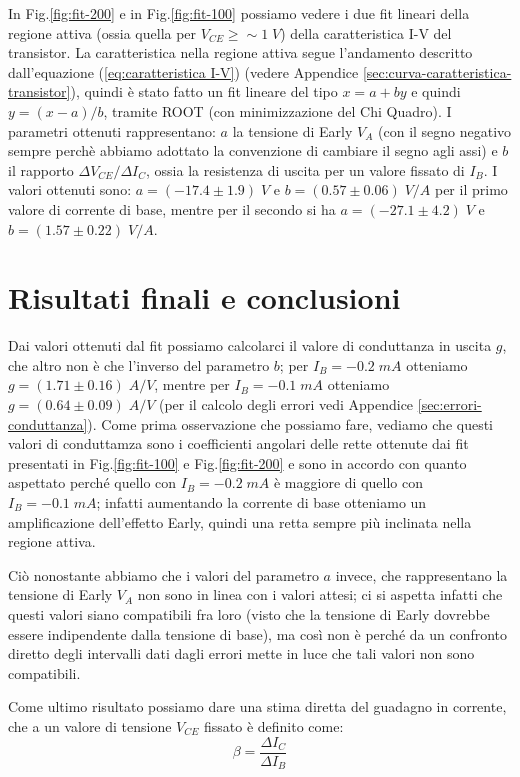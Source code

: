 \documentclass[a4paper, 11pt]{article}
\begin{document}
In Fig.\ref{fig:fit-200} e in Fig.\ref{fig:fit-100} possiamo vedere i due fit lineari della regione attiva (ossia quella per $V_{CE}\geq \sim 1 \;V $) della caratteristica I-V del transistor. La caratteristica nella regione attiva segue l'andamento descritto dall'equazione (\ref{eq:caratteristica I-V}) (vedere Appendice \ref{sec:curva-caratteristica-transistor}), quindi è stato fatto un fit lineare del tipo $x = a + by$ e quindi $y = (x-a)/b$, tramite ROOT (con minimizzazione del Chi Quadro). I parametri ottenuti rappresentano: $a$ la tensione di Early $V_A$ (con il segno negativo sempre perchè abbiamo adottato la convenzione di cambiare il segno agli assi) e $b$ il rapporto $\Delta V_{CE} / \Delta I_C$, ossia la resistenza di uscita per un
valore fissato di $I_B$. I valori ottenuti sono: $a = (-17.4 \pm 1.9) \;V$ e $b = (0.57 \pm 0.06) \; V/A$ per il primo valore di corrente di base, mentre per il secondo si ha $a = (-27.1 \pm 4.2) \;V$ e $b = (1.57 \pm 0.22) \; V/A$.
 
\section{Risultati finali e conclusioni}
Dai valori ottenuti dal fit possiamo calcolarci il valore di conduttanza in uscita $g$, che altro non è che l'inverso del parametro $b$; per $I_B = -0.2 \; mA$ otteniamo $g = (1.71 \pm 0.16) \;A/V$, mentre per $I_B = -0.1 \; mA$ otteniamo $g = (0.64 \pm 0.09) \;A/V$ (per il calcolo degli errori vedi Appendice \ref{sec:errori-conduttanza}). Come prima osservazione che possiamo fare, vediamo che questi valori di conduttamza sono i coefficienti angolari delle rette ottenute dai fit presentati in Fig.\ref{fig:fit-100} e Fig.\ref{fig:fit-200} e sono in accordo con quanto aspettato perché quello con $I_B = -0.2 \; mA$ è maggiore di quello con $I_B = -0.1 \; mA$; infatti aumentando la corrente di base otteniamo un amplificazione dell'effetto Early, quindi una retta sempre più inclinata nella regione attiva. 

Ciò nonostante abbiamo che i valori del parametro $a$ invece, che rappresentano la tensione di Early $V_A$ non sono in linea con i valori attesi; ci si aspetta infatti che questi valori siano compatibili fra loro (visto che la tensione di Early dovrebbe essere indipendente dalla tensione di base), ma così non è perché da un confronto diretto degli intervalli dati dagli errori mette in luce che tali valori non sono compatibili.

Come ultimo risultato possiamo dare una stima diretta del guadagno in corrente, che a un valore di tensione $V_{CE}$ fissato è definito come:
\begin{equation*}
    \beta = \frac{\Delta I_C}{\Delta I_B}
\end{equation*}
\end{document}

